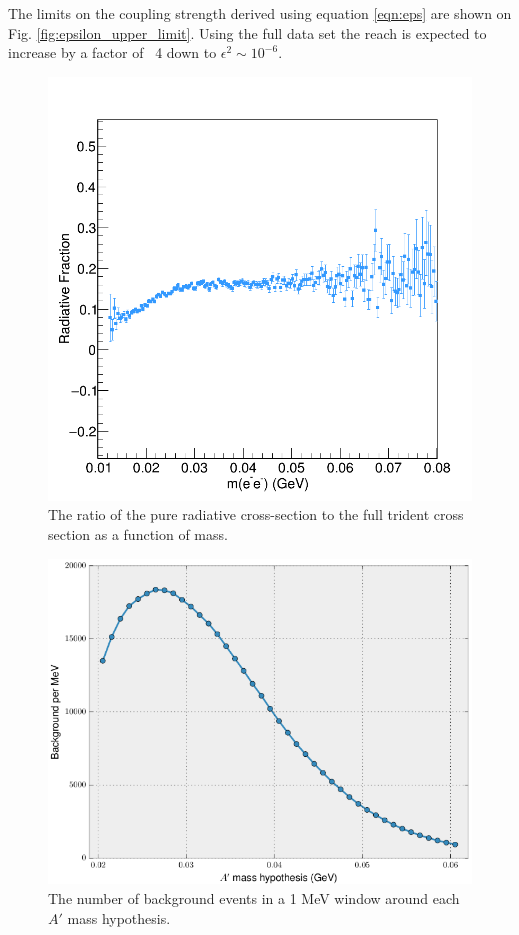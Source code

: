 The limits on the coupling strength derived using equation \ref{eqn:eps}
are shown on Fig. \ref{fig:epsilon_upper_limit}. Using the full data set
the reach is expected to increase by a factor of ~4 down to $\epsilon^2 \sim 10^{-6}$.
\begin{figure}[ht]
    \centering
    \includegraphics[width=.8\textwidth]{images/rad_frac.png}
    \caption{The ratio of the pure radiative cross-section to the full trident 
             cross section as a function of mass.}
    \label{fig:rad_frac}
\end{figure}
\begin{figure}[hb]
    \centering
    \includegraphics[width=\textwidth]{images/bkg_mev.png}
    \caption{The number of background events in a 1 MeV window around each $A'$ mass hypothesis.}
    \label{fig:background_mev}
\end{figure}
